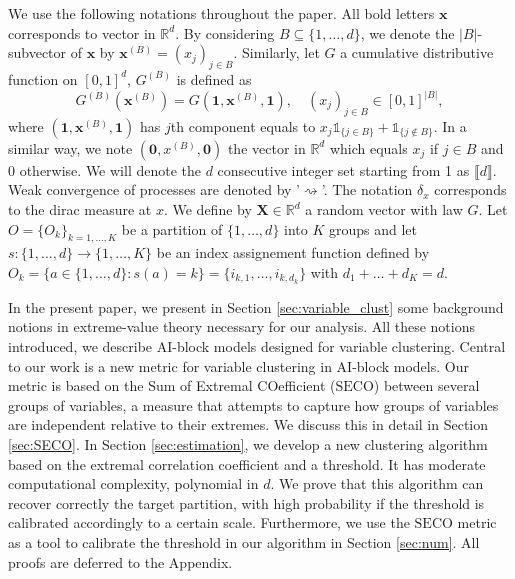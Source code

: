 \documentclass[11pt]{article}
\newcommand{\SECO}{\mathrm{SECO}}
\theoremstyle{definition}
\begin{document}
	We use the following notations throughout the paper. All bold letters $\textbf{x}$ corresponds to vector in $\mathbb{R}^d$. By considering $B \subseteq \{1,\dots,d\}$, we denote the $|B|$-subvector of $\textbf{x}$ by $\textbf{x}^{(B)} = (x_j)_{j \in B}$. Similarly, let $G$ a cumulative distributive function on $[0,1]^d$, $G^{(B)}$ is defined as
	\begin{equation*}
		G^{(B)}(\textbf{x}^{(B)}) = G(\textbf{1},\textbf{x}^{(B)}, \textbf{1}), \quad (x_j)_{j \in B} \in [0,1]^{|B|},
	\end{equation*}
	where $(\textbf{1},\textbf{x}^{(B)}, \textbf{1})$ has $j$th component equals to $x_j \mathds{1}_{\{j \in B\}} + \mathds{1}_{\{ j \notin B\}}$. In a similar way, we note $(\textbf{0}, x^{(B)}, \textbf{0})$ the vector in $\mathbb{R}^d$ which equals $x_j$ if $j \in B$ and $ 0 $ otherwise. We will denote the $d$ consecutive integer set starting from 1 as $\llbracket d \rrbracket$. Weak convergence of processes are denoted by '$\rightsquigarrow$'. The notation $\delta_x$ corresponds to the dirac measure at $x$. We define by $\textbf{X} \in \mathbb{R}^d$ a random vector with law $G$. Let $O = \{O_k\}_{k= 1 ,\dots, K}$ be a partition of $\{1,\dots,d\}$ into $K$ groups and let $s : \{1,\dots,d\} \rightarrow \{1,\dots,K\}$ be an index assignement function defined by $O_k = \{a \in \{1,\dots,d\} : s(a) = k\} = \{i_{k,1}, \dots, i_{k,d_k}\}$ with $d_1+\dots+d_K = d$.
	
	In the present paper, we present in Section \ref{sec:variable_clust} some background notions in extreme-value theory necessary for our analysis. All these notions introduced, we describe AI-block models designed for variable clustering. Central to our work is a new metric for variable clustering in AI-block models. Our metric is based on the Sum of Extremal COefficient ($\SECO$) between several groups of variables, a measure that attempts to capture how groups of variables are independent relative to their extremes. We discuss this in detail in Section \ref{sec:SECO}. In Section \ref{sec:estimation}, we develop a new clustering algorithm based on the extremal correlation coefficient and a threshold. It has moderate computational complexity, polynomial in $d$. We prove that this algorithm can recover correctly the target partition, with high probability if the threshold is calibrated accordingly to a certain scale. Furthermore, we use the $\SECO$ metric as a tool to calibrate the threshold in our algorithm in Section \ref{sec:num}. All proofs are deferred to the Appendix.
	
\end{document}
